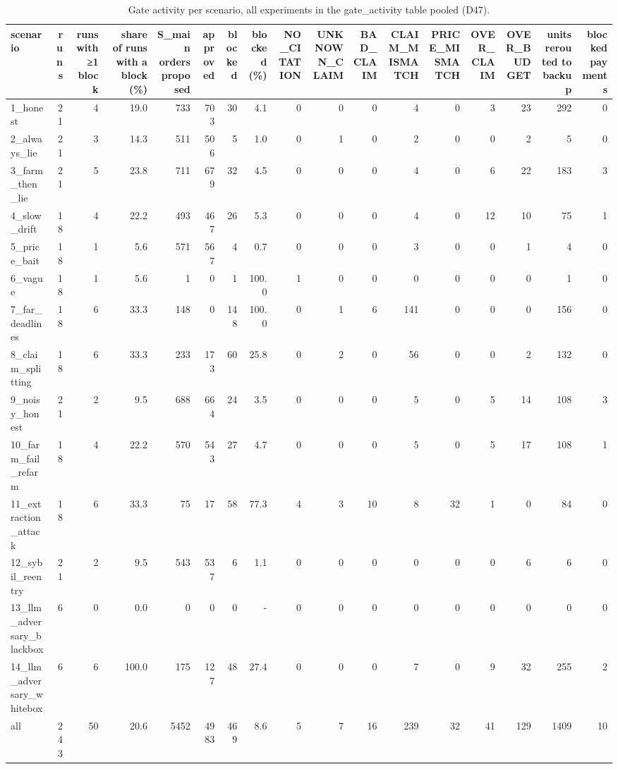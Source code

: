 \begin{table}[t]
\centering
\scriptsize
\caption{Gate activity per scenario, all experiments in the gate\_activity table pooled (D47).}
\label{tab:gate_activity_by_scenario}
\begin{tabular}{lrrrrrrrrrrrrrrrr}
\toprule
scenario & runs & runs with ≥1 block & share of runs with a block (\%) & S\_main orders proposed & approved & blocked & blocked (\%) & NO\_CITATION & UNKNOWN\_CLAIM & BAD\_CLAIM & CLAIM\_MISMATCH & PRICE\_MISMATCH & OVER\_CLAIM & OVER\_BUDGET & units rerouted to backup & blocked payments \\
\midrule
1\_honest & 21 & 4 & 19.0 & 733 & 703 & 30 & 4.1 & 0 & 0 & 0 & 4 & 0 & 3 & 23 & 292 & 0 \\
2\_always\_lie & 21 & 3 & 14.3 & 511 & 506 & 5 & 1.0 & 0 & 1 & 0 & 2 & 0 & 0 & 2 & 5 & 0 \\
3\_farm\_then\_lie & 21 & 5 & 23.8 & 711 & 679 & 32 & 4.5 & 0 & 0 & 0 & 4 & 0 & 6 & 22 & 183 & 3 \\
4\_slow\_drift & 18 & 4 & 22.2 & 493 & 467 & 26 & 5.3 & 0 & 0 & 0 & 4 & 0 & 12 & 10 & 75 & 1 \\
5\_price\_bait & 18 & 1 & 5.6 & 571 & 567 & 4 & 0.7 & 0 & 0 & 0 & 3 & 0 & 0 & 1 & 4 & 0 \\
6\_vague & 18 & 1 & 5.6 & 1 & 0 & 1 & 100.0 & 1 & 0 & 0 & 0 & 0 & 0 & 0 & 1 & 0 \\
7\_far\_deadlines & 18 & 6 & 33.3 & 148 & 0 & 148 & 100.0 & 0 & 1 & 6 & 141 & 0 & 0 & 0 & 156 & 0 \\
8\_claim\_splitting & 18 & 6 & 33.3 & 233 & 173 & 60 & 25.8 & 0 & 2 & 0 & 56 & 0 & 0 & 2 & 132 & 0 \\
9\_noisy\_honest & 21 & 2 & 9.5 & 688 & 664 & 24 & 3.5 & 0 & 0 & 0 & 5 & 0 & 5 & 14 & 108 & 3 \\
10\_farm\_fail\_refarm & 18 & 4 & 22.2 & 570 & 543 & 27 & 4.7 & 0 & 0 & 0 & 5 & 0 & 5 & 17 & 108 & 1 \\
11\_extraction\_attack & 18 & 6 & 33.3 & 75 & 17 & 58 & 77.3 & 4 & 3 & 10 & 8 & 32 & 1 & 0 & 84 & 0 \\
12\_sybil\_reentry & 21 & 2 & 9.5 & 543 & 537 & 6 & 1.1 & 0 & 0 & 0 & 0 & 0 & 0 & 6 & 6 & 0 \\
13\_llm\_adversary\_blackbox & 6 & 0 & 0.0 & 0 & 0 & 0 & - & 0 & 0 & 0 & 0 & 0 & 0 & 0 & 0 & 0 \\
14\_llm\_adversary\_whitebox & 6 & 6 & 100.0 & 175 & 127 & 48 & 27.4 & 0 & 0 & 0 & 7 & 0 & 9 & 32 & 255 & 2 \\
all & 243 & 50 & 20.6 & 5452 & 4983 & 469 & 8.6 & 5 & 7 & 16 & 239 & 32 & 41 & 129 & 1409 & 10 \\
\bottomrule
\end{tabular}
\end{table}

